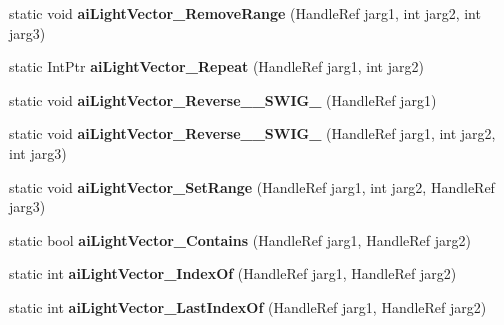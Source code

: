 \begin{DoxyCompactItemize}
\item 
\hypertarget{class_assimp_p_i_n_v_o_k_e_ab7343b94ac028006a904f719728916b9}{static void {\bfseries ai\+Light\+Vector\+\_\+\+Remove\+Range} (Handle\+Ref jarg1, int jarg2, int jarg3)}\label{class_assimp_p_i_n_v_o_k_e_ab7343b94ac028006a904f719728916b9}

\item 
\hypertarget{class_assimp_p_i_n_v_o_k_e_abc380c4a3a52f83a130acdaa8431906e}{static Int\+Ptr {\bfseries ai\+Light\+Vector\+\_\+\+Repeat} (Handle\+Ref jarg1, int jarg2)}\label{class_assimp_p_i_n_v_o_k_e_abc380c4a3a52f83a130acdaa8431906e}

\item 
\hypertarget{class_assimp_p_i_n_v_o_k_e_a787136164988da7f56e4ee2319e1003c}{static void {\bfseries ai\+Light\+Vector\+\_\+\+Reverse\+\_\+\+\_\+\+S\+W\+I\+G\+\_} (Handle\+Ref jarg1)}\label{class_assimp_p_i_n_v_o_k_e_a787136164988da7f56e4ee2319e1003c}

\item 
\hypertarget{class_assimp_p_i_n_v_o_k_e_a5eab6447b2333a18361402c9aaab820c}{static void {\bfseries ai\+Light\+Vector\+\_\+\+Reverse\+\_\+\+\_\+\+S\+W\+I\+G\+\_} (Handle\+Ref jarg1, int jarg2, int jarg3)}\label{class_assimp_p_i_n_v_o_k_e_a5eab6447b2333a18361402c9aaab820c}

\item 
\hypertarget{class_assimp_p_i_n_v_o_k_e_ae580f3ae31be3e68999ea0acb8fff331}{static void {\bfseries ai\+Light\+Vector\+\_\+\+Set\+Range} (Handle\+Ref jarg1, int jarg2, Handle\+Ref jarg3)}\label{class_assimp_p_i_n_v_o_k_e_ae580f3ae31be3e68999ea0acb8fff331}

\item 
\hypertarget{class_assimp_p_i_n_v_o_k_e_aa75eb4fdbf05a37bda7e67ff6944e275}{static bool {\bfseries ai\+Light\+Vector\+\_\+\+Contains} (Handle\+Ref jarg1, Handle\+Ref jarg2)}\label{class_assimp_p_i_n_v_o_k_e_aa75eb4fdbf05a37bda7e67ff6944e275}

\item 
\hypertarget{class_assimp_p_i_n_v_o_k_e_a735ef0a83fc5ab674d43e9a9087dac00}{static int {\bfseries ai\+Light\+Vector\+\_\+\+Index\+Of} (Handle\+Ref jarg1, Handle\+Ref jarg2)}\label{class_assimp_p_i_n_v_o_k_e_a735ef0a83fc5ab674d43e9a9087dac00}

\item 
\hypertarget{class_assimp_p_i_n_v_o_k_e_a048c28fdb308edb62e6cbc9eb1e3a09f}{static int {\bfseries ai\+Light\+Vector\+\_\+\+Last\+Index\+Of} (Handle\+Ref jarg1, Handle\+Ref jarg2)}\label{class_assimp_p_i_n_v_o_k_e_a048c28fdb308edb62e6cbc9eb1e3a09f}


\end{DoxyCompactItemize}
